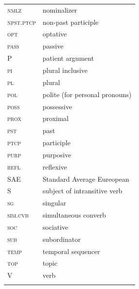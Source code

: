 \documentclass[output=paper,colorlinks,citecolor=brown]{langscibook}
\begin{document}
\begin{tabularx}{.44\textwidth}{@{}lQ@{}}
\textsc{nmlz} & nominalizer \\
\textsc{npst.ptcp} & non-past participle \\
\textsc{opt} & optative \\
\textsc{pass} & passive \\
\textsc{P} & patient argument\\
\textsc{pi} & plural inclusive \\
\textsc{pl} & plural \\
\textsc{pol} & polite (for personal pronouns) \\
\textsc{poss} & possessive \\
\textsc{prox} & proximal \\
\textsc{pst} & past \\
\textsc{ptcp} & participle \\
\textsc{purp} & purposive \\
\textsc{refl} & reflexive \\
SAE & Standard Average Eureopean\\
S & subject of intransitive verb\\
\textsc{sg} & singular \\
\textsc{sim.cvb} & simultaneous converb \\
\textsc{soc} & sociative \\
\textsc{sub} & subordinator \\
\textsc{temp} & temporal sequencer \\
\textsc{top} & topic \\
V & verb\\\\
\end{tabularx}




\printbibliography[heading=subbibliography,notkeyword=this]
\end{document}
